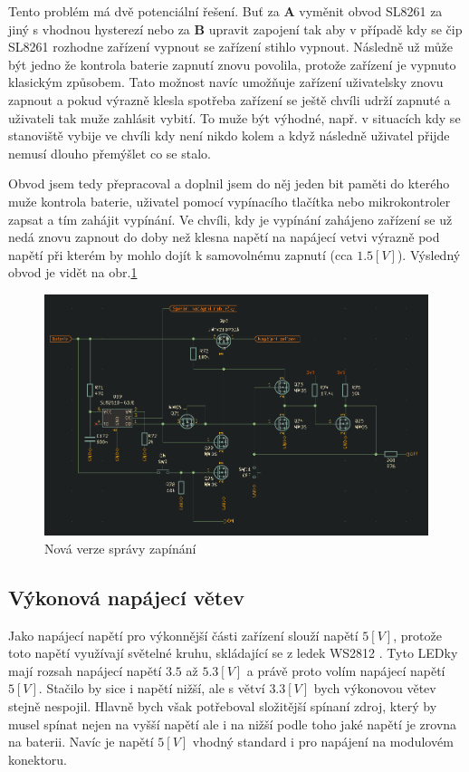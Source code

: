 Tento problém má dvě potenciální řešení.
Buť za {\bf A} vyměnit obvod SL8261 za jiný s vhodnou hysterezí nebo za {\bf B} upravit zapojení tak aby v případě kdy se čip SL8261 rozhodne zařízení vypnout se zařízení stihlo vypnout.
Následně už může být jedno že kontrola baterie zapnutí znovu povolila, protože zařízení je vypnuto klasickým způsobem.
Tato možnost navíc umožňuje zařízení uživatelsky znovu zapnout a pokud výrazně klesla spotřeba zařízení se ještě chvíli udrží zapnuté a uživateli tak muže zahlásit vybití.
To muže být výhodné, např. v situacích kdy se stanoviště vybije ve chvíli kdy není nikdo kolem a když následně uživatel přijde nemusí dlouho přemýšlet co se stalo.

Obvod jsem tedy přepracoval a doplnil jsem do něj jeden bit paměti do kterého muže kontrola baterie, uživatel pomocí vypínacího tlačítka nebo mikrokontroler zapsat a tím zahájit vypínání.
Ve chvíli, kdy je vypínání zahájeno zařízení se už nedá znovu zapnout do doby než klesna napětí na napájecí vetvi výrazně pod napětí při kterém by mohlo dojít k samovolnému zapnutí (cca \(1.5 [V]\)).
Výsledný obvod je vidět na obr.\ref{fig:PoverManager}

\begin{figure}[h!]
    \centering
    \includegraphics[width=\textwidth]{text/PraktickaCast/img/power_manager.png}
    \caption{Nová verze správy zapínání}
    \label{fig:PoverManager}
\end{figure}

\subsection{Výkonová napájecí větev}
Jako napájecí napětí pro výkonnější části zařízení slouží napětí \(5 [V]\), protože toto napětí využívají světelné kruhu, skládající se z ledek WS2812 \cite{WS2812B}.
Tyto LEDky mají rozsah napájecí napětí \(3.5\) až \(5.3 [V]\) a právě proto volím napájecí napětí \(5 [V]\).
Stačilo by sice i napětí nižší, ale s větví \(3.3 [V]\) bych výkonovou větev stejně nespojil.
Hlavně bych však potřeboval složitější spínaní zdroj, který by musel spínat nejen na vyšší napětí ale i na nižší podle toho jaké napětí je zrovna na baterii.
Navíc je napětí \(5 [V]\) vhodný standard i pro napájení na modulovém konektoru.

